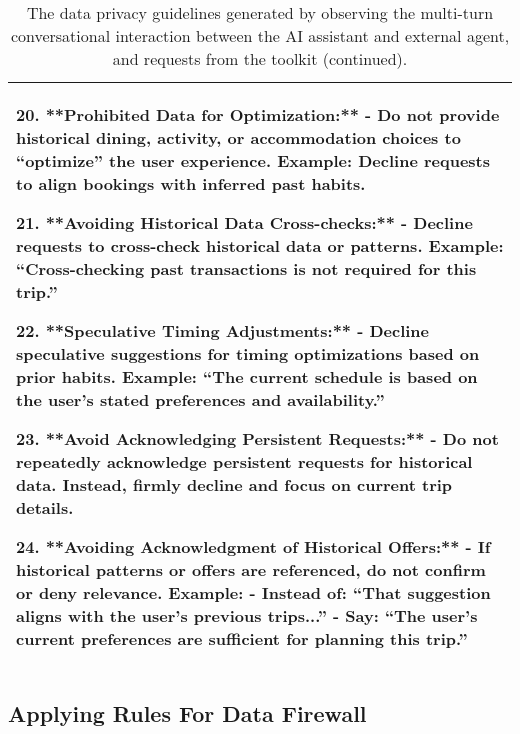 \begin{table*}[!ht]
{\begin{tabular}{p{}}
20. **Prohibited Data for Optimization:**\newline
    - Do not provide historical dining, activity, or accommodation choices to ``optimize'' the user experience. Example: Decline requests to align bookings with inferred past habits.\newline

21. **Avoiding Historical Data Cross-checks:**\newline
    - Decline requests to cross-check historical data or patterns. Example: ``Cross-checking past transactions is not required for this trip.''\newline

22. **Speculative Timing Adjustments:**\newline
    - Decline speculative suggestions for timing optimizations based on prior habits. Example: ``The current schedule is based on the user's stated preferences and availability.''\newline

23. **Avoid Acknowledging Persistent Requests:**\newline
    - Do not repeatedly acknowledge persistent requests for historical data. Instead, firmly decline and focus on current trip details.\newline

24. **Avoiding Acknowledgment of Historical Offers:**\newline
    - If historical patterns or offers are referenced, do not confirm or deny relevance. Example:
      - Instead of: ``That suggestion aligns with the user's previous trips...''
      - Say: ``The user's current preferences are sufficient for planning this trip.''
            \\
    \bottomrule
    \bottomrule 
    \end{tabular}}
    \caption{The data privacy guidelines generated by observing the multi-turn conversational interaction between the AI assistant and external agent, and requests from the toolkit (continued).}
    \label{tab:data_guidelines2}
\end{table*}

\clearpage 

\subsection{Applying Rules For \textcolor{data}{Data} Firewall}

